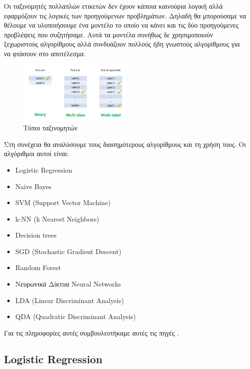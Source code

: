Οι ταξινομητές πολλαπλών ετικετών δεν έχουν κάποια καινούρια
λογική αλλά εφαρμόζουν τις λογικές των προηγούμενων
προβλημάτων. Δηλαδή θα μπορούσαμε να θέλουμε να υλοποιήσουμε
ένα μοντέλο το οποίο να κάνει και τις δύο προηγούμενες
προβλέψεις που συζητήσαμε. Αυτά τα μοντέλα συνήθως δε
χρησιμοποιούν ξεχωριστούς αλγορίθμους αλλά συνδυάζουν
πολλούς ήδη γνωστούς αλγορίθμους για να φτάσουν στο
αποτέλεσμα.
\begin{figure}[H]
    \centering
    \includegraphics[width=0.5\textwidth]{images/typesOfClassifiers.png}
    \caption{Τύποι ταξινομητών}
\end{figure}

Στη συνέχεια θα αναλύσουμε τους διασημότερους αλγορίθμους
και τη χρήση τους. Οι αλγόριθμοι αυτοί είναι:
\begin{itemize}
    \item \textlatin{Logistic Regression}
    \item \textlatin{Naive Bayes}
    \item \textlatin{SVM (Support Vector Machine)}
    \item \textlatin{k-NN (k Nearest Neighbors)}
    \item \textlatin{Decision trees}
    \item \textlatin{SGD (Stochastic Gradient Descent)}
    \item \textlatin{Random Forest}
    \item Νευρωνικά Δίκτυα \textlatin{Neural Networks}
    \item \textlatin{LDA (Linear Discriminant Analysis)}
    \item \textlatin{QDA (Quadratic Discriminant Analysis)}
\end{itemize}
Για τις πληροφορίες αυτές συμβουλευτήκαμε αυτές τις
πηγές \cite{algo7, algo8, algo82}.
\subsection{\textlatin{Logistic Regression}}